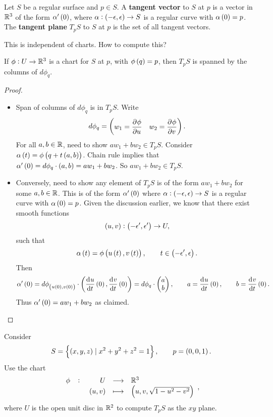 \pagebreak

\begin{definition}
Let $ S $ be a regular surface and $ p \in S $. A \textbf{tangent vector} to $ S $ at $ p $ is a vector in $ \mathbb{R}^3 $ of the form $ \alpha'\br{0} $, where $ \alpha : \br{-\epsilon, \epsilon} \to S $ is a regular curve with $ \alpha\br{0} = p $. The \textbf{tangent plane} $ T_pS $ to $ S $ at $ p $ is the set of all tangent vectors.
\end{definition}

This is independent of charts. How to compute this?

\begin{proposition}
If $ \phi : U \to \mathbb{R}^3 $ is a chart for $ S $ at $ p $, with $ \phi\br{q} = p $, then $ T_pS $ is spanned by the columns of $ d\phi_q $.
\end{proposition}

\begin{proof}
\hfill
\begin{itemize}
\item Span of columns of $ d\phi_q $ is in $ T_pS $. Write
$$ d\phi_q = \onebytwo{w_1 = \dpd{\phi}{u}}{w_2 = \dpd{\phi}{v}}. $$
For all $ a, b \in \mathbb{R} $, need to show $ aw_1 + bw_2 \in T_pS $. Consider $ \alpha\br{t} = \phi\br{q + t\br{a, b}} $. Chain rule implies that $ \alpha'\br{0} = d\phi_q \cdot \br{a, b} = aw_1 + bw_2 $. So $ aw_1 + bw_2 \in T_pS $.
\item Conversely, need to show any element of $ T_pS $ is of the form $ aw_1 + bw_2 $ for some $ a, b \in \mathbb{R} $. This is of the form $ \alpha'\br{0} $ where $ \alpha : \br{-\epsilon, \epsilon} \to S $ is a regular curve with $ \alpha\br{0} = p $. Given the discussion earlier, we know that there exist smooth functions
$$ \br{u, v} : \br{-\epsilon', \epsilon'} \to U, $$
such that
$$ \alpha\br{t} = \phi\br{u\br{t}, v\br{t}}, \qquad t \in \br{-\epsilon', \epsilon}. $$
Then
$$ \alpha'\br{0} = d\phi_{\br{u\br{0}, v\br{0}}} \cdot \br{\dod{u}{t}\br{0}, \dod{v}{t}\br{0}} = d\phi_q \cdot \twobyone{a}{b}, \qquad a = \dod{u}{t}\br{0}, \qquad b = \dod{v}{t}\br{0}. $$
Thus $ \alpha'\br{0} = aw_1 + bw_2 $ as claimed.
\end{itemize}
\end{proof}

\begin{example*}
Consider
$$ S = \cbr{\br{x, y, z} \mid x^2 + y^2 + z^2 = 1}, \qquad p = \br{0, 0, 1}. $$
Use the chart
$$ \function[\phi]{U}{\R^3}{\br{u, v}}{\br{u, v, \sqrt{1 - u^2 - v^2}}}, $$
where $ U $ is the open unit disc in $ \mathbb{R}^2 $ to compute $ T_pS $ as the $ xy $ plane.
\end{example*}

